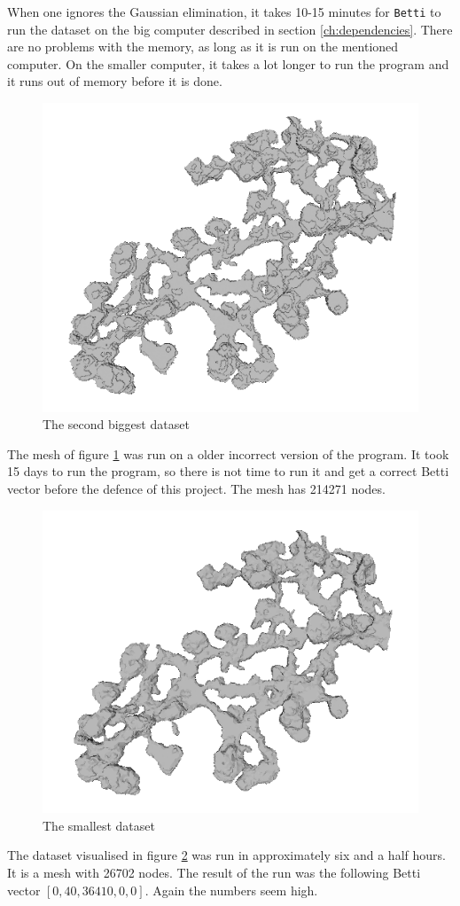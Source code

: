 \documentclass[11pt,a4paper,twoside]{report}
\begin{document}
When one ignores the Gaussian elimination, it takes 10-15 minutes for \texttt{Betti} to run the dataset on the big computer described in section \ref{ch:dependencies}. There are no problems with the memory, as long as it is run on the mentioned computer. On the smaller computer, it takes a lot longer to run the program and it runs out of memory before it is done.
\begin{figure}[H]
\center
\includegraphics[scale=0.5]{testmesh2d00.png}
\caption{The second biggest dataset}
\label{fig:mesh_2d}
\end{figure}
The mesh of figure \ref{fig:mesh_2d} was run on a older incorrect version of the program. It took 15 days to run the program, so there is not time to run it and get a correct Betti vector before the defence of this project. The mesh has 214271 nodes.

\begin{figure}[H]
\center
\includegraphics[scale=0.5]{testmesh00.png}
\caption{The smallest dataset}
\label{fig:mesh_}
\end{figure}
The dataset visualised in figure \ref{fig:mesh_} was run in approximately six and a half hours. It is a mesh with 26702 nodes. The result of the run was the following Betti vector $[0,40,36410,0,0]$. Again the numbers seem high.
\end{document}
